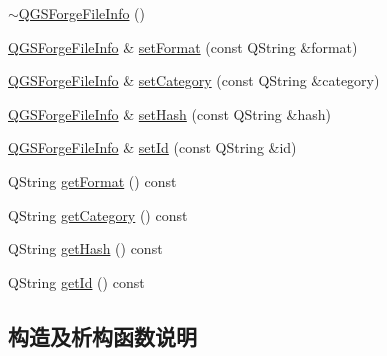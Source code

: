 \begin{DoxyCompactItemize}
\item 
\mbox{\hyperlink{class_q_g_s_forge_version_info_1_1_q_g_s_forge_file_info_acd3cd316160ab125d1fbe0aecbb3c542}{$\sim$\+Q\+G\+S\+Forge\+File\+Info}} ()
\item 
\mbox{\hyperlink{class_q_g_s_forge_version_info_1_1_q_g_s_forge_file_info}{Q\+G\+S\+Forge\+File\+Info}} \& \mbox{\hyperlink{class_q_g_s_forge_version_info_1_1_q_g_s_forge_file_info_abdce9d011a0eea2a5e9f3ba8f57bde08}{set\+Format}} (const Q\+String \&format)
\item 
\mbox{\hyperlink{class_q_g_s_forge_version_info_1_1_q_g_s_forge_file_info}{Q\+G\+S\+Forge\+File\+Info}} \& \mbox{\hyperlink{class_q_g_s_forge_version_info_1_1_q_g_s_forge_file_info_acc613e18ed616474100b33043843211f}{set\+Category}} (const Q\+String \&category)
\item 
\mbox{\hyperlink{class_q_g_s_forge_version_info_1_1_q_g_s_forge_file_info}{Q\+G\+S\+Forge\+File\+Info}} \& \mbox{\hyperlink{class_q_g_s_forge_version_info_1_1_q_g_s_forge_file_info_af05a6ccf8cd5746406153d0e60d1a851}{set\+Hash}} (const Q\+String \&hash)
\item 
\mbox{\hyperlink{class_q_g_s_forge_version_info_1_1_q_g_s_forge_file_info}{Q\+G\+S\+Forge\+File\+Info}} \& \mbox{\hyperlink{class_q_g_s_forge_version_info_1_1_q_g_s_forge_file_info_aa7eab6bad4d559a0d463a7830b30820c}{set\+Id}} (const Q\+String \&id)
\item 
Q\+String \mbox{\hyperlink{class_q_g_s_forge_version_info_1_1_q_g_s_forge_file_info_af6dd7c5443a0ac573bea7055b9a31762}{get\+Format}} () const
\item 
Q\+String \mbox{\hyperlink{class_q_g_s_forge_version_info_1_1_q_g_s_forge_file_info_a95eb2238c6c439e7f661b93576c068f5}{get\+Category}} () const
\item 
Q\+String \mbox{\hyperlink{class_q_g_s_forge_version_info_1_1_q_g_s_forge_file_info_a47765700580e8cdaaf69456a9313d9f6}{get\+Hash}} () const
\item 
Q\+String \mbox{\hyperlink{class_q_g_s_forge_version_info_1_1_q_g_s_forge_file_info_a0f343480eb94298c71beb414220684dd}{get\+Id}} () const
\end{DoxyCompactItemize}


\subsection{构造及析构函数说明}
\mbox{\label{class_q_g_s_forge_version_info_1_1_q_g_s_forge_file_info_ad5dac531ed0582c20fc33f3675f9ba6e}} 
